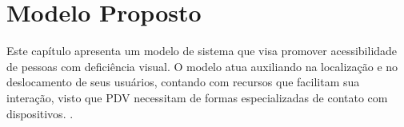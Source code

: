 \documentclass[english,brazilian]{UNISINOSmonografia}
\begin{document}

\chapter{Modelo Proposto}



Este capítulo apresenta um modelo de sistema que visa promover acessibilidade de pessoas com deficiência visual. O modelo atua auxiliando na localização e no deslocamento de seus usuários, contando com recursos que facilitam sua interação, visto que PDV necessitam de formas especializadas de contato com dispositivos. .
\end{document}
